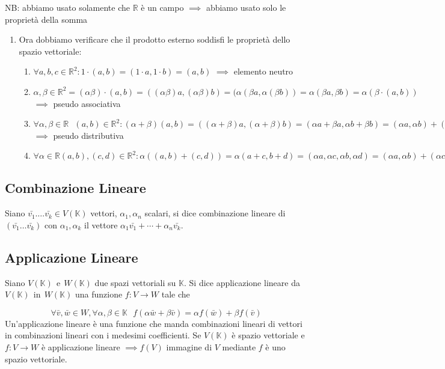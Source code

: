 \documentclass{article}
\begin{document}
NB\@: abbiamo usato solamente che $\mathbb{R}$ è un campo $\implies$ abbiamo
usato solo le proprietà della somma
\begin{enumerate}
    \item Ora dobbiamo verificare che il prodotto esterno soddisfi le proprietà dello
          spazio vettoriale:
          \begin{enumerate}
              \item $\forall a,b,c \in \mathbb{R}^2 : 1\cdot(a,b)=(1\cdot a, 1\cdot b) = (a,b)$ $\implies$ elemento neutro
              \item $\alpha,\beta \in \mathbb{R}^2 = (\alpha\beta)\cdot(a,b)=((\alpha\beta)a, (\alpha\beta)b) = (\alpha(\beta a, \alpha(\beta b)) = \alpha(\beta a, \beta b) = \alpha(\beta \cdot(a,b))$ $\implies$ pseudo associativa
              \item $\forall \alpha,\beta\in\mathbb{R} \ \ \ (a,b) \in \mathbb{R}^2 : (\alpha+\beta)(a,b) = ((\alpha+\beta)a, (\alpha+\beta)b)=(\alpha a+\beta a, \alpha b + \beta b) = (\alpha a, \alpha b)+(\beta a, \beta b) = \alpha(a,b) + \beta(a,b)$ $\implies$ pseudo distributiva
              \item $\forall \alpha \in \mathbb{R} (a,b) ,(c,d) \in \mathbb{R}^2 : \alpha((a,b)+(c,d)) = \alpha(a+c,b+d)=(\alpha a, \alpha c, \alpha b, \alpha d)=(\alpha a, \alpha b) + (\alpha c, \alpha d) = \alpha(a,b)+\alpha(c,d)$
          \end{enumerate}

\end{enumerate}

\subsection{Combinazione Lineare}
Siano $\bar{v_1}\dots.\bar{v_k}\in V(\mathbb{K})$ vettori, $\alpha_1, \alpha_n$
scalari, si dice combinazione lineare di $(\bar{v_1}\dots\bar{v_k})$ con
$\alpha_1,\alpha_k$ il vettore $\alpha_1\bar{v_1}+\cdots+\alpha_n\bar{v_k}$.

\subsection{Applicazione Lineare}
Siano $V(\mathbb{K}) \ \ \text{e}\ \ W(\mathbb{K})$ due spazi vettoriali su
$\mathbb{K}$. Si dice applicazione lineare da $V(\mathbb{K}) \ \ \text{in} \ \
    W(\mathbb{K})$ una funzione $f:V\rightarrow W$ tale che

\[
    \forall \bar{v}, \bar{w}\in W, \forall\alpha,\beta\in\mathbb{K} \ \ \ f(\alpha\bar{w}+\beta\bar{v})=\alpha f(\bar{w})+\beta f(\bar{v})
\]
Un’applicazione lineare è una funzione che manda combinazioni lineari di
vettori in combinazioni lineari con i medesimi coefficienti. Se $V(\mathbb{K})$
è spazio vettoriale e $f:V\rightarrow W$ è applicazione lineare $\implies f(V)$
immagine di $V$ mediante $f$ è uno spazio vettoriale.
\end{document}
